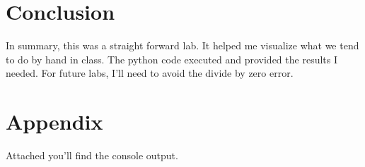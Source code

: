 \documentclass[12pt]{article}
\begin{document}
\section{Conclusion}
In summary, this was a straight forward lab. It helped me visualize what we tend to do by hand in class. The python code executed and provided the results I needed. For future labs, I'll need to avoid the divide by zero error.

\section{Appendix}
Attached you'll find the console output.
\end{document}
